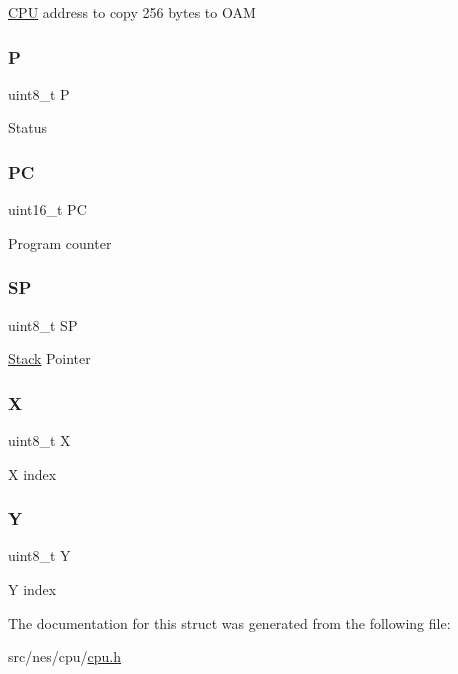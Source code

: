\hyperlink{struct_c_p_u}{C\+PU} address to copy 256 bytes to O\+AM \mbox{\label{struct_c_p_u_a2ad95e9194a5bfaa373bbd26ea925209}} 
\subsubsection{\texorpdfstring{P}{P}}
{\footnotesize\ttfamily uint8\+\_\+t P}

Status \mbox{\label{struct_c_p_u_afa06037aaac5044b97dde7b9f8771ce6}} 
\subsubsection{\texorpdfstring{PC}{PC}}
{\footnotesize\ttfamily uint16\+\_\+t PC}

Program counter \mbox{\label{struct_c_p_u_a11a50c8ce97cdc9e1588fa7201e388f3}} 
\subsubsection{\texorpdfstring{SP}{SP}}
{\footnotesize\ttfamily uint8\+\_\+t SP}

\hyperlink{struct_stack}{Stack} Pointer \mbox{\label{struct_c_p_u_aab1bda195b91ffec73b84bc55e9dccf1}} 
\subsubsection{\texorpdfstring{X}{X}}
{\footnotesize\ttfamily uint8\+\_\+t X}

X index \mbox{\label{struct_c_p_u_a76ad371f34c724bc71c518bd836a2e2b}} 
\subsubsection{\texorpdfstring{Y}{Y}}
{\footnotesize\ttfamily uint8\+\_\+t Y}

Y index 

The documentation for this struct was generated from the following file\+:\begin{DoxyCompactItemize}
\item 
src/nes/cpu/\hyperlink{cpu_8h}{cpu.\+h}\end{DoxyCompactItemize}
